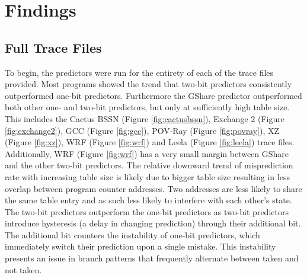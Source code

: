 \section{Findings}
\subsection{Full Trace Files}
To begin, the predictors were run for the entirety of each of the trace files provided. Most programs showed the trend that two-bit predictors consistently outperformed one-bit predictors. Furthermore the GShare predictor outperformed both other one- and two-bit predictors, but only at sufficiently high table size. This includes the Cactus BSSN (Figure \ref{fig:cactusbssn}), Exchange 2 (Figure \ref{fig:exchange2}), GCC (Figure \ref{fig:gcc}), POV-Ray (Figure \ref{fig:povray}), XZ (Figure \ref{fig:xz}), WRF (Figure \ref{fig:wrf}) and Leela (Figure \ref{fig:leela}) trace files. Additionally, WRF (Figure \ref{fig:wrf}) has a very small margin between GShare and the other two-bit predictors. The relative downward trend of misprediction rate with increasing table size is likely due to bigger table size resulting in less overlap between program counter addresses. Two addresses are less likely to share the same table entry and as such less likely to interfere with each other's state. The two-bit predictors outperform the one-bit predictors as two-bit predictors introduce hysteresis (a delay in changing prediction) through their additional bit. The additional bit counters the instability of one-bit predictors, which immediately switch their prediction upon a single mistake. This instability presents an issue in branch patterns that frequently alternate between taken and not taken.

